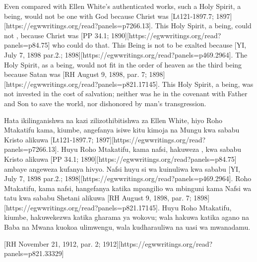 Even compared with Ellen White’s authenticated works, such a Holy Spirit, a being, would not be one with God because Christ was [Lt121-1897.7; 1897][https://egwwritings.org/read?panels=p7266.13]. This Holy Spirit, a being, could not , because Christ was [PP 34.1; 1890][https://egwwritings.org/read?panels=p84.75] who could do that. This Being is not to be exalted because [YI, July 7, 1898 par.2.; 1898][https://egwwritings.org/read?panels=p469.2964]. The Holy Spirit, as a being, would not fit in the order of heaven as the third being because Satan was [RH August 9, 1898, par. 7; 1898][https://egwwritings.org/read?panels=p821.17145]. This Holy Spirit, a being, was not invested in the cost of salvation; neither was he in the covenant with Father and Son to save the world, nor dishonored by man’s transgression.


Hata ikilinganishwa na kazi zilizothibitishwa za Ellen White, hiyo Roho Mtakatifu kama, kiumbe, angefanya isiwe kitu kimoja na Mungu kwa sababu Kristo alikuwa [Lt121-1897.7; 1897][https://egwwritings.org/read?panels=p7266.13]. Huyu Roho Mtakatifu, kama nafsi, hakuweza , kwa sababu Kristo alikuwa [PP 34.1; 1890][https://egwwritings.org/read?panels=p84.75] ambaye angeweza kufanya hivyo. Nafsi huyu si wa kuinuliwa kwa sababu [YI, July 7, 1898 par.2.; 1898][https://egwwritings.org/read?panels=p469.2964]. Roho Mtakatifu, kama nafsi, hangefanya katika mpangilio wa mbinguni kama Nafsi wa tatu kwa sababu Shetani alikuwa [RH August 9, 1898, par. 7; 1898][https://egwwritings.org/read?panels=p821.17145]. Huyu Roho Mtakatifu, kiumbe, hakuwekezwa katika gharama ya wokovu; wala hakuwa katika agano na Baba na Mwana kuokoa ulimwengu, wala kudharauliwa na uasi wa mwanadamu.


[RH November 21, 1912, par. 2; 1912][https://egwwritings.org/read?panels=p821.33329]


